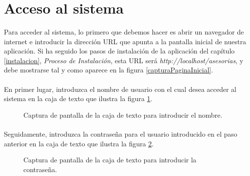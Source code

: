 \section{Acceso al sistema}

  \paragraph{}Para acceder al sistema, lo primero que debemos hacer es abrir
  un navegador de internet e introducir la dirección URL que apunta a la
  pantalla inicial de nuestra aplicación. Si ha seguido los pasos de instalación
  de la aplicación del capítulo \ref{instalacion},
  \textit{Proceso de Instalación}, esta URL será
  \textit{http://localhost/asesorias}, y debe mostrarse tal y como aparece en la
  figura \ref{capturaPaginaInicial}.

  \paragraph{}En primer lugar, introduzca el nombre de usuario con el cual desea
  acceder al sistema en la caja de texto que ilustra la figura
  \ref{capturaCajaTextoNombre}.

  \begin{figure}[!ht]
    \begin{center}
      \caption{Captura de pantalla de la caja de texto para introducir el nombre.}
      \label{capturaCajaTextoNombre}
    \end{center}
  \end{figure}

  \paragraph{}Seguidamente, introduzca la contraseña para el usuario introducido
  en el paso anterior en la caja de texto que ilustra la figura
  \ref{capturaCajaTextoPassword}.

  \begin{figure}[!ht]
    \begin{center}
      \caption{Captura de pantalla de la caja de texto para introducir la contraseña.}
      \label{capturaCajaTextoPassword}
    \end{center}
  \end{figure}

